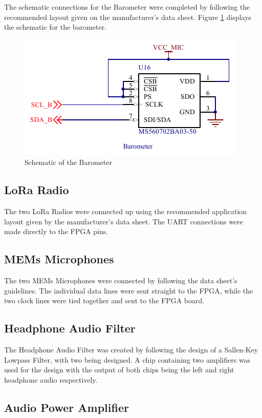 	The schematic connections for the Barometer were completed by following the recommended layout given on the manufacturer's data sheet. 
Figure \ref{fig:barometer} displays the schematic for the barometer. 

\begin{figure}
	\includegraphics[width=0.5\linewidth]{Figures/barometer.pdf}\centering
	\caption{Schematic of the Barometer}
	\label{fig:barometer}
\end{figure}

\subsection{LoRa Radio}

	The two LoRa Radios were connected up using the recommended application layout given by the manufacturer's data sheet. The UART connections were made directly to the FPGA pins.

\subsection{MEMs Microphones}
\label{chap:mics}

	The two MEMs Microphones were connected by following the data sheet's guidelines. The individual data lines were sent straight to the FPGA, while the two clock lines were tied together and sent to the FPGA board. 

\subsection{Headphone Audio Filter} 
\label{chap:audio2}

	The Headphone Audio Filter was created by following the design of a Sallen-Key Lowpass Filter, with two being designed. A chip containing two amplifiers was used for the design with the output of both chips being the left and right headphone audio respectively. 

\subsection{Audio Power Amplifier}
\label{chap:audio}

